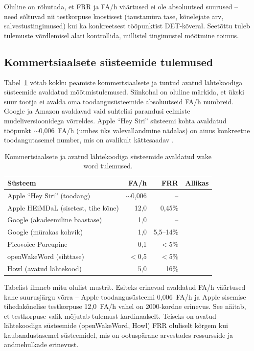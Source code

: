 Oluline on rõhutada, et FRR ja FA/h väärtused ei ole absoluutsed suurused -- need sõltuvad nii testkorpuse koostisest (taustamüra tase, kõnelejate arv, salvestustingimused) kui ka konkreetsest tööpunktist DET-kõveral. Seetõttu tuleb tulemuste võrdlemisel alati kontrollida, millistel tingimustel mõõtmine toimus.

\subsection{Kommertsiaalsete süsteemide tulemused}\label{subsec:commercial-benchmarks}

Tabel~\ref{tab:commercial-benchmarks} võtab kokku peamiste kommertsiaalsete ja tuntud avatud lähtekoodiga süsteemide avaldatud mõõtmistulemused. Siinkohal on oluline märkida, et ükski suur tootja ei avalda oma toodangusüsteemide absoluutseid FA/h numbreid. Google ja Amazon avaldavad vaid suhtelisi parandusi eelmiste mudeliversioonidega võrreldes. Apple \enquote{Hey Siri} süsteemi kohta avaldatud tööpunkt \mbox{$\sim$0,006~FA/h} (umbes üks valevallandmine nädalas) on ainus konkreetne toodangutasemel number, mis on avalikult kättesaadav \cite{apple-heysiri2017}.

\begin{table}[H]
\centering
\caption{Kommertsiaalsete ja avatud lähtekoodiga süsteemide avaldatud wake word tulemused.}
\label{tab:commercial-benchmarks}
\begin{tabular}{l r r l}
\hline
\textbf{Süsteem} & \textbf{FA/h} & \textbf{FRR} & \textbf{Allikas} \\
\hline
Apple \enquote{Hey Siri} (toodang) & $\sim$0,006 & -- & \cite{apple-heysiri2017} \\
Apple HEiMDaL (sisetest, tihe kõne) & 12,0 & 0,45\% & \cite{kundu2023heimdal} \\
Google (akadeemiline baastase) & 1,0 & -- & \cite{sainath2015cnn} \\
Google (mürakas kohvik) & 1,0 & 5,5--14\% & \cite{sindhwani2015structured} \\
Picovoice Porcupine & 0,1 & $<$5\% & \cite{picovoice-benchmark2026} \\
openWakeWord (sihttase) & $<$0,5 & $<$5\% & \cite{openwakeword2026} \\
Howl (avatud lähtekood) & 5,0 & 16\% & \cite{tang2020howl} \\
\hline
\end{tabular}
\end{table}

Tabelist ilmneb mitu olulist mustrit. Esiteks erinevad avaldatud FA/h väärtused kahe suurusjärgu võrra -- Apple toodangusüsteemi 0,006~FA/h ja Apple sisemise tihedakõnelise testkorpuse 12,0~FA/h vahel on 2000-kordne erinevus. See näitab, et testkorpuse valik mõjutab tulemust kardinaalselt. Teiseks on avatud lähtekoodiga süsteemide (openWakeWord, Howl) FRR oluliselt kõrgem kui kaubandustasemel süsteemidel, mis on ootuspärane arvestades ressursside ja andmehulkade erinevust.

